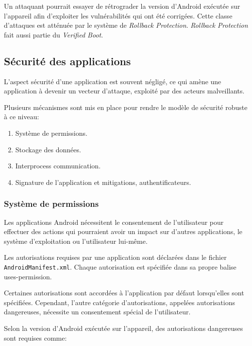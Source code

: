 \documentclass[
  french,
  paper=a4,
  ,captions=tableheading
]{scrartcl}
\providecommand{\tightlist}{%
  \setlength{\itemsep}{0pt}\setlength{\parskip}{0pt}}
\begin{document}
Un attaquant pourrait essayer de rétrograder la version d'Android
exécutée sur l'appareil afin d'exploiter les vulnérabilités qui ont été
corrigées. Cette classe d'attaques est atténuée par le système de
\emph{Rollback Protection}. \emph{Rollback Protection} fait aussi partie
du \emph{Verified Boot}.

\hypertarget{suxe9curituxe9-des-applications}{%
\subsection{Sécurité des
applications}\label{suxe9curituxe9-des-applications}}

L'aspect sécurité d'une application est souvent négligé, ce qui amène
une application à devenir un vecteur d'attaque, exploité par des acteurs
malveillants.

Plusieurs mécanismes sont mis en place pour rendre le modèle de sécurité
robuste à ce niveau:

\begin{enumerate}
\def\labelenumi{\arabic{enumi}.}
\tightlist
\item
  Système de permissions.
\item
  Stockage des données.
\item
  Interprocess communication.
\item
  Signature de l'application et mitigations, authentificateurs.
\end{enumerate}

\hypertarget{systuxe8me-de-permissions}{%
\subsubsection{Système de permissions}\label{systuxe8me-de-permissions}}

Les applications Android nécessitent le consentement de l'utilisateur
pour effectuer des actions qui pourraient avoir un impact sur d'autres
applications, le système d'exploitation ou l'utilisateur lui-même.

Les autorisations requises par une application sont déclarées dans le
fichier \texttt{AndroidManifest.xml}. Chaque autorisation est spécifiée
dans sa propre balise uses-permission.

Certaines autorisations sont accordées à l'application par défaut
lorsqu'elles sont spécifiées. Cependant, l'autre catégorie
d'autorisations, appelées autorisations dangereuses, nécessite un
consentement spécial de l'utilisateur.

Selon la version d'Android exécutée sur l'appareil, des autorisations
dangereuses sont requises comme:
\end{document}
